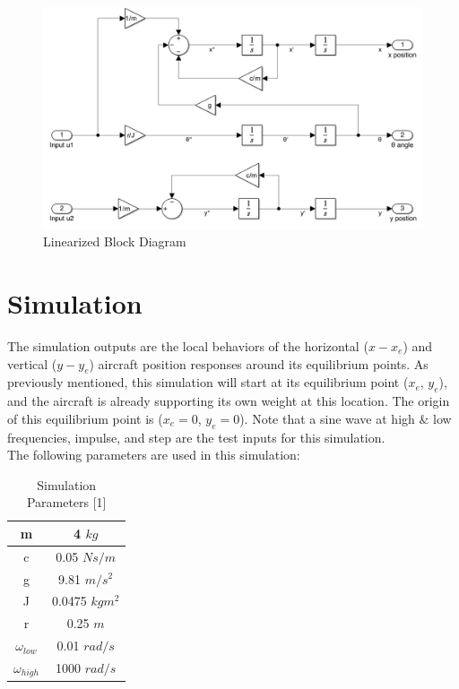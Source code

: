 \documentclass[conference]{IEEEtran}
\begin{document}
\begin{figure}[htbp!]
\centerline{\includegraphics[scale=0.3]{LinearBlock.png}}
\caption{Linearized Block Diagram}
\label{figure}
\end{figure}

\section{Simulation}
The simulation outputs are the local behaviors of the horizontal ($x - x_e$) and vertical ($y - y_e$) aircraft position responses around its equilibrium points. As previously mentioned, this simulation will start at its equilibrium point ($x_e$, $y_e$), and the aircraft is already supporting its own weight at this location. The origin of this equilibrium point is ($x_e = 0$, $y_e = 0$). Note that a sine wave at high \& low frequencies, impulse, and step are the test inputs for this simulation. \\

The following parameters are used in this simulation:
\begin{table}[h]
\begin{center}
\caption{Simulation Parameters [1]}
\label{thelabel}
\begin{tabular}{ |c|c| } 
\hline
m	& 4	$kg$\\
\hline
c	&0.05 $Ns/m$\\
\hline
g	 &9.81 $m/s^2$\\
\hline
J	&0.0475	$kgm^2$\\
\hline
r&	0.25 $m$\\
\hline
$\omega_{low}$&	0.01 $rad/s$\\
\hline
$\omega_{high}$&	1000 $rad/s$\\
\hline
\end{tabular}
\end{center}

\end{table}
\end{document}

